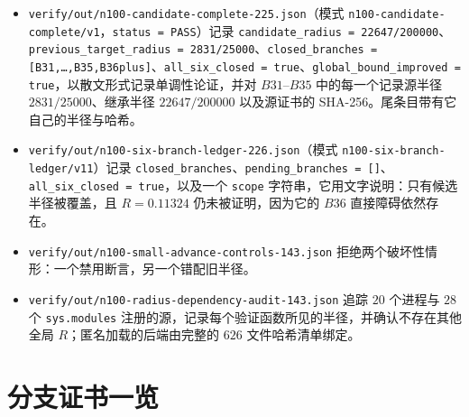 \begin{itemize}[leftmargin=1.4em,itemsep=3pt]
\item \texttt{verify/\allowbreak{}out/\allowbreak{}n100-\allowbreak{}candidate-\allowbreak{}complete-\allowbreak{}225.json}（模式 \texttt{n100-\allowbreak{}candidate-\allowbreak{}complete/\allowbreak{}v1}，\texttt{status = PASS}）记录 \texttt{candidate\_\allowbreak{}radius = 22647/\allowbreak{}200000}、\texttt{previous\_\allowbreak{}target\_\allowbreak{}radius = 2831/\allowbreak{}25000}、\texttt{closed\_\allowbreak{}branches = [B31,\dots,B35,B36plus]}、\texttt{all\_\allowbreak{}six\_\allowbreak{}closed = true}、\texttt{global\_\allowbreak{}bound\_\allowbreak{}improved = true}，以散文形式记录单调性论证，并对 $B31$--$B35$ 中的每一个记录源半径 $2831/25000$、继承半径 $22647/200000$ 以及源证书的 SHA-256。尾条目带有它自己的半径与哈希。
\item \texttt{verify/\allowbreak{}out/\allowbreak{}n100-\allowbreak{}six-\allowbreak{}branch-\allowbreak{}ledger-\allowbreak{}226.json}（模式 \texttt{n100-\allowbreak{}six-\allowbreak{}branch-\allowbreak{}ledger/\allowbreak{}v11}）记录 \texttt{closed\_\allowbreak{}branches}、\texttt{pending\_\allowbreak{}branches =
[]}、\texttt{all\_\allowbreak{}six\_\allowbreak{}closed = true}，以及一个 \texttt{scope} 字符串，它用文字说明：只有候选半径被覆盖，且 $R=0.11324$ 仍未被证明，因为它的 $B36$ 直接障碍依然存在。
\item {\footnotesize\texttt{verify/\allowbreak{}out/\allowbreak{}n100-\allowbreak{}small-\allowbreak{}advance-\allowbreak{}controls-\allowbreak{}143.json}} 拒绝两个破坏性情形：一个禁用断言，另一个错配旧半径。
\item {\footnotesize\texttt{verify/\allowbreak{}out/\allowbreak{}n100-\allowbreak{}radius-\allowbreak{}dependency-\allowbreak{}audit-\allowbreak{}143.json}} 追踪 $20$ 个进程与 $28$ 个 \texttt{sys.modules} 注册的源，记录每个验证函数所见的半径，并确认不存在其他全局 $R$；匿名加载的后端由完整的 $626$ 文件哈希清单绑定。
\end{itemize}

\section{分支证书一览}

